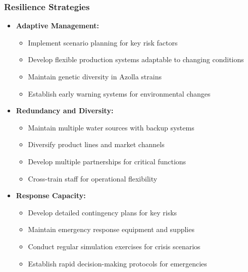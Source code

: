 \subsubsection{Resilience Strategies}
\begin{itemize}
    \item \textbf{Adaptive Management:}
    \begin{itemize}
        \item Implement scenario planning for key risk factors
        \item Develop flexible production systems adaptable to changing conditions
        \item Maintain genetic diversity in Azolla strains
        \item Establish early warning systems for environmental changes
    \end{itemize}
    
    \item \textbf{Redundancy and Diversity:}
    \begin{itemize}
        \item Maintain multiple water sources with backup systems
        \item Diversify product lines and market channels
        \item Develop multiple partnerships for critical functions
        \item Cross-train staff for operational flexibility
    \end{itemize}
    
    \item \textbf{Response Capacity:}
    \begin{itemize}
        \item Develop detailed contingency plans for key risks
        \item Maintain emergency response equipment and supplies
        \item Conduct regular simulation exercises for crisis scenarios
        \item Establish rapid decision-making protocols for emergencies
    \end{itemize}
\end{itemize}
